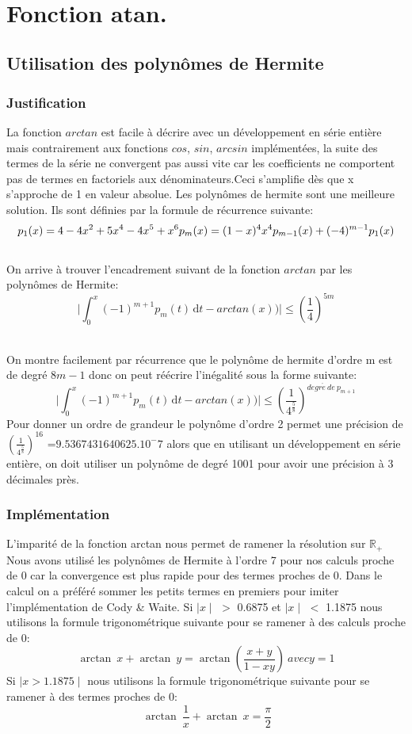\documentclass[a4,12pt]{article}
\begin{document}
\\
\newpage

\cleardoublepage
\section{Fonction atan.}
\subsection{Utilisation des polynômes de Hermite}
\subsubsection{Justification}
La fonction $arctan$ est facile à décrire avec un développement en série entière mais contrairement aux fonctions $cos$, $sin$, $arcsin$ implémentées, la suite des termes de la série ne convergent pas aussi vite car les coefficients ne comportent pas de termes en factoriels aux dénominateurs.Ceci s'amplifie dès que x s'approche de 1 en valeur absolue.
Les polynômes de hermite sont une meilleure solution.
Ils sont définies par la formule de récurrence suivante: 
$$
p_{1}(x)=4-4x^{2}+5x^{4}-4x^{5}+x^{6}\\
p_{m}(x)=(1-x)^{4}x^{4}p_{m-1}(x)+(-4)^{m-1}p_{1}(x)
$$
\\
On arrive à trouver l'encadrement suivant de la fonction $arctan$ par les polynômes de Hermite:
$$
\mid\int_{0}^{x} (-1)^{m+1}p_{m}(t) \, \mathrm dt - arctan(x))\mid \leq (\frac{1}{4})^{5m}
$$

\\
On montre facilement par récurrence que le polynôme de hermite d'ordre m  est de degré $8m-1$ donc on peut réécrire l'inégalité sous la forme suivante:
$$
\mid\int_{0}^{x} (-1)^{m+1}p_{m}(t) \, \mathrm dt - arctan(x))\mid \leq (\frac{1}{4^{\frac{5}{8}}})^{degr\acute e\ de\ p_{m+1}}
$$
Pour donner un ordre de grandeur le polynôme d'ordre 2 permet une précision de $(\frac{1}{4^{\frac{5}{8}}})^{16}$ =$9.5367431640625.10^-7$ alors que en utilisant un développement en série entière, on doit utiliser un polynôme de degré 1001 pour avoir une précision à 3 décimales près.

\subsubsection{Implémentation}
L'imparité de la fonction arctan nous permet de ramener la résolution sur $\mathds{R}_{+}$\\
Nous avons utilisé les polynômes de Hermite à l'ordre 7 pour nos calculs proche de 0 car la convergence est plus rapide pour des termes proches de 0.
Dans le calcul on a préféré sommer les petits termes en premiers pour imiter l'implémentation de Cody \& Waite.
Si $\mid x \mid$ $>$ 0.6875  et $\mid x \mid$ $<$ 1.1875  nous utilisons la formule trigonométrique suivante pour se ramener à des calculs proche de 0:
$$
{\arctan}~x+{\arctan}~y={\arctan}\left(\frac{x+y}{1-xy}\right)\ avec y=1
$$
Si $\mid x > 1.1875 \mid$ nous utilisons la formule trigonométrique suivante pour se ramener à des termes proches de 0:
$$
\ {\arctan}\ \frac1x+{\arctan}\ x=\frac\pi2
$$
\end{document}
